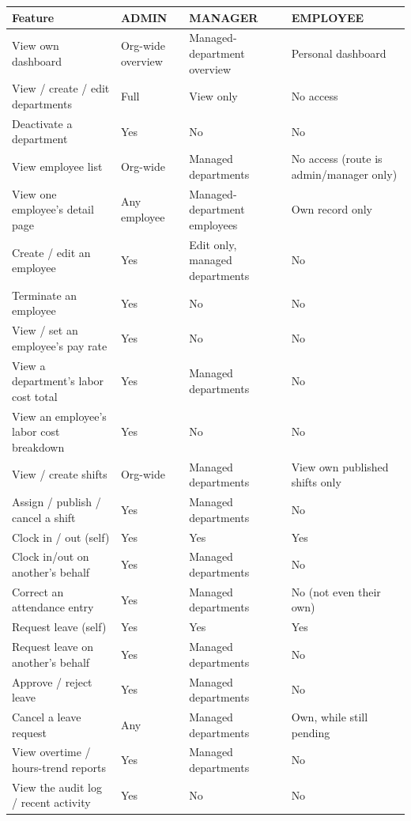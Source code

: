 \begin{longtable}{@{}p{6.4cm}p{2.6cm}p{2.9cm}p{2.9cm}@{}}
\toprule
\textbf{Feature} & \textbf{ADMIN} & \textbf{MANAGER} & \textbf{EMPLOYEE} \\
\midrule
\endhead
View own dashboard & Org-wide overview & Managed-department overview & Personal dashboard \\
View / create / edit departments & Full & View only & No access \\
Deactivate a department & Yes & No & No \\
View employee list & Org-wide & Managed departments & No access (route is admin/manager only) \\
View one employee's detail page & Any employee & Managed-department employees & Own record only \\
Create / edit an employee & Yes & Edit only, managed departments & No \\
Terminate an employee & Yes & No & No \\
View / set an employee's pay rate & Yes & No & No \\
View a department's labor cost total & Yes & Managed departments & No \\
View an employee's labor cost breakdown & Yes & No & No \\
View / create shifts & Org-wide & Managed departments & View own published shifts only \\
Assign / publish / cancel a shift & Yes & Managed departments & No \\
Clock in / out (self) & Yes & Yes & Yes \\
Clock in/out on another's behalf & Yes & Managed departments & No \\
Correct an attendance entry & Yes & Managed departments & No (not even their own) \\
Request leave (self) & Yes & Yes & Yes \\
Request leave on another's behalf & Yes & Managed departments & No \\
Approve / reject leave & Yes & Managed departments & No \\
Cancel a leave request & Any & Managed departments & Own, while still pending \\
View overtime / hours-trend reports & Yes & Managed departments & No \\
View the audit log / recent activity & Yes & No & No \\
\bottomrule
\end{longtable}
